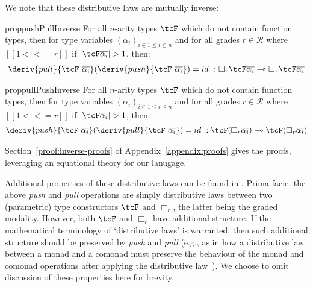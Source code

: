 We note that these distributive laws are mutually inverse:

\begin{restatable}{prop}{pushPullInverse}
  For all $n$-arity types $\tcF$ which do not contain function types,
  then for type variables $(\alpha_i)_{i \in 1 \leq i \leq n}$
  and for all grades $r \in \mathcal{R}$ where $[[1 <<= r]]$ if $|\tcF
    \overline{\alpha_i}| > 1$, then:
  \begin{align*}
\deriv{pull}{\tcF\
  \overline{\alpha_i}}(\deriv{push}{\tcF\
  \overline{\alpha_i}}) = id\ : \Box_{r} \tcF \overline{\alpha_i}
\multimap \Box_{r} \tcF \overline{\alpha_i}
    \end{align*}
\end{restatable}

\begin{restatable}{prop}{pullPushInverse}
  For all $n$-arity types $\tcF$ which do not contain function types,
  then for type variables $(\alpha_i)_{i \in 1 \leq i \leq n}$
  and for all grades $r \in \mathcal{R}$ where $[[1 <<= r]]$ if $|\tcF
    \overline{\alpha_i}| > 1$, then:
  \begin{align*}
\deriv{push}{\tcF\
  \overline{\alpha_i}}(\deriv{pull}{\tcF\
  \overline{\alpha_i}}) = id\ : \tcF (\Box_{r} \overline{\alpha_i})
\multimap \tcF (\Box_{r} \overline{\alpha_i})
    \end{align*}
  \end{restatable}

\noindent
Section~\ref{proof:inverse-proofs} of Appendix~\ref{appendix:proofs} gives the
proofs, leveraging an equational theory for our lanugage.

Additional properties of these distributive laws can be found in
\citet{DBLP:journals/corr/abs-2112-14966}. Prima facie, the above \emph{push}
and \emph{pull} operations are simply distributive laws between two (parametric)
type constructors $\tcF$ and $\Box_r$, the latter being the graded modality.
However, both $\tcF$ and $\Box_r$ have additional structure. If the mathematical
terminology of `distributive laws' is warranted, then such additional structure
should be preserved by \emph{push} and \emph{pull} (e.g., as in how a
distributive law between a monad and a comonad must preserve the behaviour of
the monad and comonad operations after applying the distributive
law~\citep{power2002combining}). We choose to omit discussion of these
properties here for brevity. 

